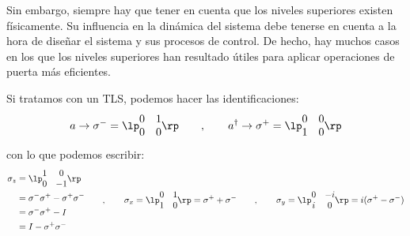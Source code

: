    Sin embargo, siempre hay que tener en cuenta que los niveles superiores existen físicamente. Su influencia en la dinámica del sistema debe tenerse en cuenta a la hora de diseñar el sistema y sus procesos de control. De hecho, hay muchos casos en los que los niveles superiores han resultado útiles para aplicar operaciones de puerta más eficientes.


        Si tratamos con un TLS, podemos hacer las identificaciones:
        \begin{equation} \label{ec_scq_TLS_operadores_escalera}
            a \rightarrow \sigma^{-} = \lp \begin{matrix} 0 &1 \\ 0 & 0 \end{matrix} \rp 
            \qquad , \qquad
            a^\dagger \rightarrow \sigma^{+} = \lp \begin{matrix} 0 & 0 \\ 1 & 0 \end{matrix} \rp
        \end{equation}
        con lo que podemos escribir:
        \begin{equation} \label{ec_scq_TLS_matrices_pauli}
            \begin{split}
                \sigma_z & = \lp \begin{matrix} 1 & 0 \\ 0 & -1 \end{matrix} \rp  \\
                & = \sigma^{-}\sigma^{+} - \sigma^{+} \sigma^{-}  \\
                & = \sigma^{-}\sigma^{+} - I  \\ 
                & = I - \sigma^{+}\sigma^{-}
            \end{split}
            \qquad , \qquad
            \sigma_x = \lp \begin{matrix} 0 & 1 \\ 1 & 0 \end{matrix} \rp = \sigma^{+} + \sigma^{-}
            \qquad , \qquad
            \sigma_y = \lp \begin{matrix} 0 & -i \\ i & 0 \end{matrix} \rp = i(\sigma^{+} - \sigma^{-})
        \end{equation}

    

    

